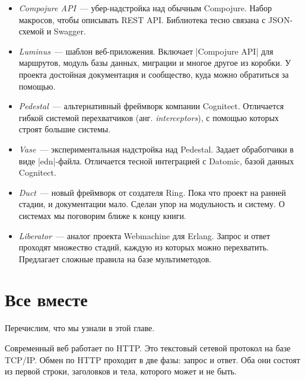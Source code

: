 \begin{itemize}

\item
  \emph{Compojure API}~---
  убер-надстройка над обычным Compojure. Набор макросов, чтобы описывать REST
  API. Библиотека тесно связана с JSON-схемой и Swagger.

\item
  \emph{Luminus}~--- шаблон
  веб-приложения. Включает \spverb|Compojure API| для маршрутов, модуль базы
  данных, миграции и многое другое из коробки. У проекта достойная документация
  и сообщество, куда можно обратиться за помощью.

\item
  \emph{Pedestal}~---
  альтернативный фреймворк компании Cognitect. Отличается гибкой системой
  перехватчиков (анг. \emph{interceptors}), с помощью которых строят большие
  системы.

\item
  \emph{Vase}~---
  экспериментальная надстройка над Pedestal. Задает обработчики в виде
  \spverb|edn|-файла. Отличается тесной интеграцией с Datomic, базой данных
  Cognitect.

\item
  \emph{Duct}~--- новый
  фреймворк от создателя Ring. Пока что проект на ранней стадии, и документации
  мало. Сделан упор на модульность и систему. О системах мы поговорим ближе к
  концу книги.

\item
  \emph{Liberator}~---
  аналог проекта Webmachine для Erlang. Запрос и ответ проходят множество
  стадий, каждую из которых можно перехватить. Предлагает сложные правила на
  базе мультиметодов.

\end{itemize}

\section{Все вместе}

Перечислим, что мы узнали в этой главе.

Современный веб работает по HTTP. Это текстовый сетевой протокол на базе
TCP/IP. Обмен по HTTP проходит в две фазы: запрос и ответ. Оба они состоят из
первой строки, заголовков и тела, которого может и не быть.

